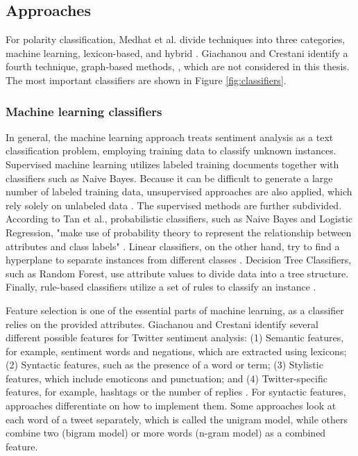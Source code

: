 \subsection{Approaches}
For polarity classification, Medhat et al. divide techniques into three categories, machine learning, lexicon-based, and hybrid \cite{MEDHAT20141093}. Giachanou and Crestani identify a fourth technique, graph-based methods, \cite{DBLP:journals/csur/GiachanouC16}, which are not considered in this thesis. The most important classifiers are shown in Figure \ref{fig:classifiers}. 

\subsubsection{Machine learning classifiers}
\label{sub:fund_mach}
In general, the machine learning approach treats sentiment analysis as a text classification problem, employing training data to classify unknown instances. Supervised machine learning utilizes labeled training documents together with classifiers such as Naive Bayes. Because it can be difficult to generate a large number of labeled training data, unsupervised approaches are also applied, which rely solely on unlabeled data \cite{MEDHAT20141093}. The supervised methods are further subdivided. According to Tan et al., probabilistic classifiers, such as Naive Bayes and Logistic Regression, "make use of probability theory to represent the relationship between attributes and class labels" \cite[p.~414]{DBLP:books/aw/TanSKK2019}. Linear classifiers, on the other hand, try to find a hyperplane to separate instances from different classes \cite{MEDHAT20141093}. Decision Tree Classifiers, such as Random Forest, use attribute values to divide data into a tree structure. Finally, rule-based classifiers utilize a set of rules to classify an instance \cite{DBLP:books/aw/TanSKK2019}.

Feature selection is one of the essential parts of machine learning, as a classifier relies on the provided attributes. Giachanou and Crestani identify several different possible features for Twitter sentiment analysis: (1) Semantic features, for example, sentiment words and negations, which are extracted using lexicons; (2) Syntactic features, such as the presence of a word or term; (3) Stylistic features, which include emoticons and punctuation; and (4) Twitter-specific features, for example, hashtags or the number of replies \cite{DBLP:journals/csur/GiachanouC16}. For syntactic features, approaches differentiate on how to implement them. Some approaches look at each word of a tweet separately, which is called the unigram model, while others combine two (bigram model) or more words (n-gram model) as a combined feature.

